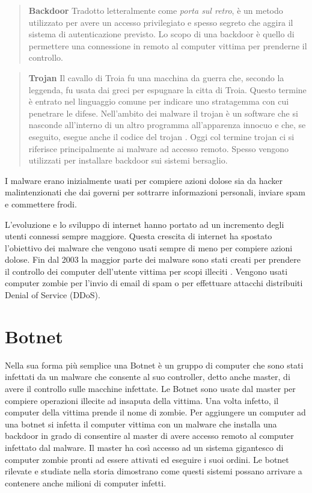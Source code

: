 \documentclass[../main.tex]{subfiles}
\begin{document}
\begin{verse}
				\textbf{Backdoor} Tradotto letteralmente come \textit{porta sul retro}, è un metodo utilizzato per avere un accesso privilegiato e spesso segreto che aggira il sistema di autenticazione previsto. Lo scopo di una backdoor è quello di permettere una connessione in remoto al computer vittima per prenderne il controllo.				
\end{verse}

\begin{verse}
				\textbf{Trojan} Il cavallo di Troia fu una macchina da guerra che, secondo la leggenda, fu usata dai greci per espugnare la citta di Troia. Questo termine è entrato nel linguaggio comune per indicare uno stratagemma con cui penetrare le difese. Nell'ambito dei malware il trojan è un software che si nasconde all'interno di un altro programma all'apparenza innocuo e che, se eseguito, esegue anche il codice del trojan \cite{TrojanDef}.
				Oggi col termine trojan ci si riferisce principalmente ai malware ad accesso remoto. Spesso vengono utilizzati per installare backdoor sui sistemi bersaglio. \cite{TrojanPurpose}
\end{verse}

I malware erano inizialmente usati per compiere azioni dolose sia da hacker malintenzionati che dai governi per sottrarre informazioni personali, inviare spam e commettere frodi. \cite{ScopoMalware} \cite{MalwareRevolution}

L'evoluzione e lo sviluppo di internet hanno portato ad un incremento degli utenti connessi sempre maggiore. Questa crescita di internet ha spostato l'obiettivo dei malware che vengono usati sempre di meno per compiere azioni dolose. Fin dal 2003 la maggior parte dei malware sono stati creati per prendere il controllo dei computer dell'utente vittima per scopi illeciti \cite{MalwareRevolution}. Vengono usati computer zombie per l'invio di email di spam o per effettuare attacchi distribuiti Denial of Service (DDoS).


\section{Botnet}
Nella sua forma più semplice una Botnet è un gruppo di computer che sono stati infettati da un malware che consente al suo controller, detto anche master, di avere il controllo sulle macchine infettate. Le Botnet sono usate dal master per compiere operazioni illecite ad insaputa della vittima. Una volta infetto, il computer della vittima prende il nome di zombie. \cite{Botnet} \newline
Per aggiungere un computer ad una botnet si infetta il computer vittima con un malware che installa una backdoor in grado di consentire al master di avere accesso remoto al computer infettato dal malware.
Il master ha così accesso ad un sistema gigantesco di computer zombie pronti ad essere attivati ed eseguire i suoi ordini. Le botnet rilevate e studiate nella storia dimostrano come questi sistemi possano arrivare a contenere anche milioni di computer infetti. \cite{Botnet}
\end{document}
